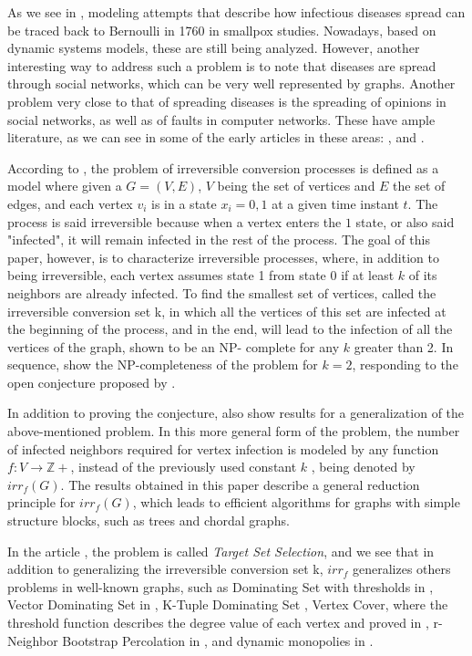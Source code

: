 As we see in \cite{dreyer2009}, modeling attempts that describe how infectious diseases spread can be traced back to Bernoulli in 1760 in smallpox studies. Nowadays, based on dynamic systems models, these are still being analyzed. However, another interesting way to address such a problem is to note that diseases are spread through social networks, which can be very well represented by graphs.
Another problem very close to that of spreading diseases is the spreading of opinions in social networks, as well as of faults in computer networks. These have ample literature, as we can see in some of the early articles in these areas: \cite{poljak1983}, \cite{degroot1974} and \cite{french1956}.

According to \cite{dreyer2009}, the problem of irreversible conversion processes is defined as a model where given a $ G = (V, E) $, $ V $ being the set of vertices and $ E $ the set of edges, and each vertex $ v_{i}$ is in a state $ x_{i} ={0, 1}$ at a given time instant $ t $. The process is said irreversible because when a vertex enters the $ 1 $ state, or also said "infected", it will remain infected in the rest of the process.
The goal of this paper, however, is to characterize irreversible processes, where, in addition to being irreversible, each vertex assumes state 1 from state 0 if at least $ k $ of its neighbors are already infected. To find the smallest set of vertices, called the irreversible conversion set k, in which all the vertices of this set are infected at the beginning of the process, and in the end, will lead to the infection of all the vertices of the graph, shown to be an NP- complete for any $ k $ greater than 2. In sequence, \cite{chen2009} show the NP-completeness of the problem for $ k = 2 $, responding to the open conjecture proposed by \citeauthor{dreyer2009}.

In addition to proving the conjecture, \citeauthor{centeno2011} also show results for a generalization of the above-mentioned problem. In this more general form of the problem, the number of infected neighbors required for vertex infection is modeled by any function $ f: V \rightarrow \mathbb{Z} +$, instead of the previously used constant $ k $ , being denoted by $ irr_{f} (G) $. The results obtained in this paper describe a general reduction principle for $ irr_{f} (G) $, which leads to efficient algorithms for graphs with simple structure blocks, such as trees and chordal graphs.

In the article \cite{chopin2014}, the problem is called \textit{Target Set Selection}, and we see that in addition to generalizing the irreversible conversion set k, $ irr_{f} $ generalizes others problems in well-known graphs, such as Dominating Set with thresholds in \cite{Cordasco2018}, Vector Dominating Set in \cite{Cicalese2013}, K-Tuple Dominating Set \cite{Liao2003}, Vertex Cover, where the threshold function describes the degree value of each vertex and proved in \cite{chen2009}, r-Neighbor Bootstrap Percolation in \cite{balogh2009}, and dynamic monopolies in \cite{Khoshkhah2012}.

